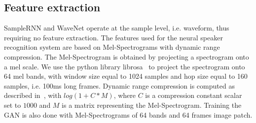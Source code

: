 \subsection{Feature extraction}
SampleRNN and WaveNet operate at the sample level, i.e. waveform, thus requiring
no feature extraction. The features used for the neural speaker recognition
system are based on Mel-Spectrograms with dynamic range compression. The
Mel-Spectrogram is obtained by projecting a spectrogram onto a mel scale. We use
the python library librosa~\cite{mcfee2015librosa} to project the spectrogram
onto 64 mel bands, with window size equal to 1024 samples and hop size equal to
160 samples, i.e. 100ms long frames. Dynamic range compression is computed as
described in~\cite{lukic2016speaker}, with $log(1 + C*M)$, where $C$ is a
compression constant scalar set to $1000$ and $M$ is a matrix representing the
Mel-Spectrogram. Training the GAN is also done with Mel-Spectrograms of 64 bands and 64 frames image patch.
                        
